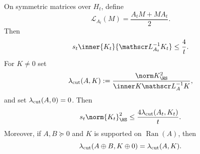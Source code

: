 \documentclass[../main.tex]{subfiles}
\begin{document}
\begin{lemma}[= Lemma~\ref{lem:lyapunov-stein-duality}]
\label{lem:sol-lyapunov-stein-duality}
On symmetric matrices over $H_t$, define
\[
 \mathscr L_{A_t}(M)=\frac{A_tM+MA_t}{2}.
\]
Then
\begin{equation}\label{eq:sol-lyapunov-stein-duality}
 s_t\inner{K_t}{\mathscr L_{A_t}^{-1}K_t}\le\frac4t.
\end{equation}
For $K\ne0$ set
\[
 \lambda_{\rm cut}(A,K)
 :=\frac{\norm K_{\HS}^2}{\inner K{\mathscr L_A^{-1}K}},
\]
and set $\lambda_{\rm cut}(A,0)=0$.  Then
\begin{equation}\label{eq:sol-cut-oriented-source-scale}
 s_t\norm{K_t}_{\HS}^2
 \le\frac{4\lambda_{\rm cut}(A_t,K_t)}t.
\end{equation}
Moreover, if $A,B\succeq0$ and $K$ is supported on $\operatorname{Ran}(A)$, then
\begin{equation}\label{eq:sol-cut-direct-sum}
 \lambda_{\rm cut}(A\oplus B,K\oplus0)=\lambda_{\rm cut}(A,K).
\end{equation}
\end{lemma}
\end{document}
